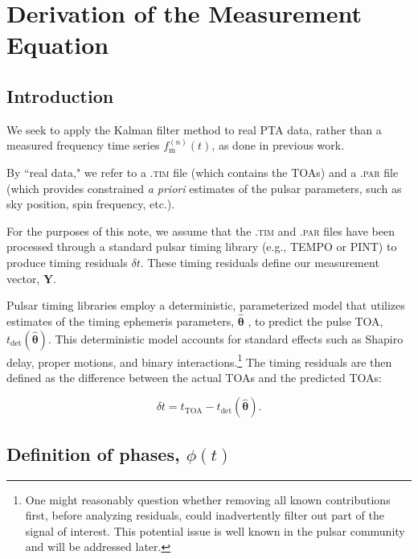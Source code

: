 \documentclass[]{scrartcl}
\begin{document}
\section{Derivation of the Measurement Equation}

\subsection{Introduction}
We seek to apply the Kalman filter method to real PTA data, rather than a measured frequency time series $f_{\textrm{m}}^{(n)}(t)$, as done in previous work. \newline 

\noindent By ``real data," we refer to a \textsc{.tim} file (which contains the TOAs) and a \textsc{.par} file (which provides constrained \textit{a priori} estimates of the pulsar parameters, such as sky position, spin frequency, etc.). \newline

For the purposes of this note, we assume that the \textsc{.tim} and \textsc{.par} files have been processed through a standard pulsar timing library (e.g., TEMPO or PINT) to produce timing residuals $\delta t$. These timing residuals define our measurement vector, $\boldsymbol{Y}$. \newline 

Pulsar timing libraries employ a deterministic, parameterized model that utilizes estimates of the timing ephemeris parameters, $\boldsymbol{\hat{\theta}}$ , to predict the pulse TOA, $t_{\text{det}}(\boldsymbol{\hat{\theta}})$. This deterministic model accounts for standard effects such as Shapiro delay, proper motions, and binary interactions.\footnote{One might reasonably question whether removing all known contributions first, before analyzing residuals, could inadvertently filter out part of the signal of interest. This potential issue is well known in the pulsar community and will be addressed later.} The timing residuals are then defined as the difference between the actual TOAs and the predicted TOAs:

\begin{equation}
	\delta t = t_{\text{TOA}} - t_{\text{det}}(\boldsymbol{\hat{\theta}}). \label{eq:delta_t_og_defn}
\end{equation}


\subsection{Definition of phases, $\phi(t)$}
\end{document}
